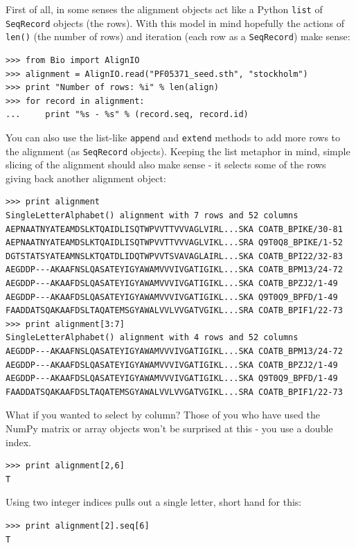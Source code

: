 \documentclass{report}
\begin{document}
First of all, in some senses the alignment objects act like a Python \verb|list| of
\verb|SeqRecord| objects (the rows). With this model in mind hopefully the actions
of \verb|len()| (the number of rows) and iteration (each row as a \verb|SeqRecord|)
make sense:

\begin{verbatim}
>>> from Bio import AlignIO
>>> alignment = AlignIO.read("PF05371_seed.sth", "stockholm")
>>> print "Number of rows: %i" % len(align)
>>> for record in alignment:
...     print "%s - %s" % (record.seq, record.id)
\end{verbatim}

You can also use the list-like \verb|append| and \verb|extend| methods to add
more rows to the alignment (as \verb|SeqRecord| objects). Keeping the list
metaphor in mind, simple slicing of the alignment should also make sense -
it selects some of the rows giving back another alignment object:

\begin{verbatim}
>>> print alignment
SingleLetterAlphabet() alignment with 7 rows and 52 columns
AEPNAATNYATEAMDSLKTQAIDLISQTWPVVTTVVVAGLVIRL...SKA COATB_BPIKE/30-81
AEPNAATNYATEAMDSLKTQAIDLISQTWPVVTTVVVAGLVIKL...SRA Q9T0Q8_BPIKE/1-52
DGTSTATSYATEAMNSLKTQATDLIDQTWPVVTSVAVAGLAIRL...SKA COATB_BPI22/32-83
AEGDDP---AKAAFNSLQASATEYIGYAWAMVVVIVGATIGIKL...SKA COATB_BPM13/24-72
AEGDDP---AKAAFDSLQASATEYIGYAWAMVVVIVGATIGIKL...SKA COATB_BPZJ2/1-49
AEGDDP---AKAAFDSLQASATEYIGYAWAMVVVIVGATIGIKL...SKA Q9T0Q9_BPFD/1-49
FAADDATSQAKAAFDSLTAQATEMSGYAWALVVLVVGATVGIKL...SRA COATB_BPIF1/22-73
>>> print alignment[3:7]
SingleLetterAlphabet() alignment with 4 rows and 52 columns
AEGDDP---AKAAFNSLQASATEYIGYAWAMVVVIVGATIGIKL...SKA COATB_BPM13/24-72
AEGDDP---AKAAFDSLQASATEYIGYAWAMVVVIVGATIGIKL...SKA COATB_BPZJ2/1-49
AEGDDP---AKAAFDSLQASATEYIGYAWAMVVVIVGATIGIKL...SKA Q9T0Q9_BPFD/1-49
FAADDATSQAKAAFDSLTAQATEMSGYAWALVVLVVGATVGIKL...SRA COATB_BPIF1/22-73
\end{verbatim}

What if you wanted to select by column? Those of you who have used the NumPy
matrix or array objects won't be surprised at this - you use a double index.

\begin{verbatim}
>>> print alignment[2,6]
T
\end{verbatim}

\noindent Using two integer indices pulls out a single letter, short hand for this:

\begin{verbatim}
>>> print alignment[2].seq[6]
T
\end{verbatim}
\end{document}
